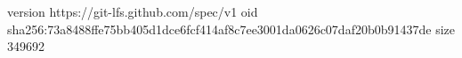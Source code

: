 version https://git-lfs.github.com/spec/v1
oid sha256:73a8488ffe75bb405d1dce6fcf414af8c7ee3001da0626c07daf20b0b91437de
size 349692
